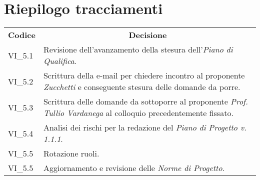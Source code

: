 
\section{Riepilogo tracciamenti}
\begin{longtable} {
		>{\centering}p{17mm} 
		>{}p{120mm}}
	\rowcolor{gray!50}
	\textbf{Codice} & \multicolumn{1}{c}{\textbf{Decisione}} \\%
	VI\_5.1 & Revisione dell'avanzamento della stesura dell'\textit{Piano di Qualifica}. \TBstrut \\ [2mm]
	VI\_5.2 & Scrittura della e-mail per chiedere incontro al proponente \textit{Zucchetti} e conseguente stesura delle domande da porre. \TBstrut \\ [2mm]
	VI\_5.3 & Scrittura delle domande da sottoporre al proponente \textit{Prof. Tullio Vardanega} al colloquio precedentemente fissato. \TBstrut \\ [2mm]
	VI\_5.4 & Analisi dei rischi per la redazione del \textit{Piano di Progetto v. 1.1.1}. \TBstrut \\ [2mm]
	VI\_5.5 & Rotazione ruoli. \TBstrut \\ [2mm]
	VI\_5.5 & Aggiornamento e revisione delle \textit{Norme di Progetto}. \TBstrut \\ [2mm]
\end{longtable}